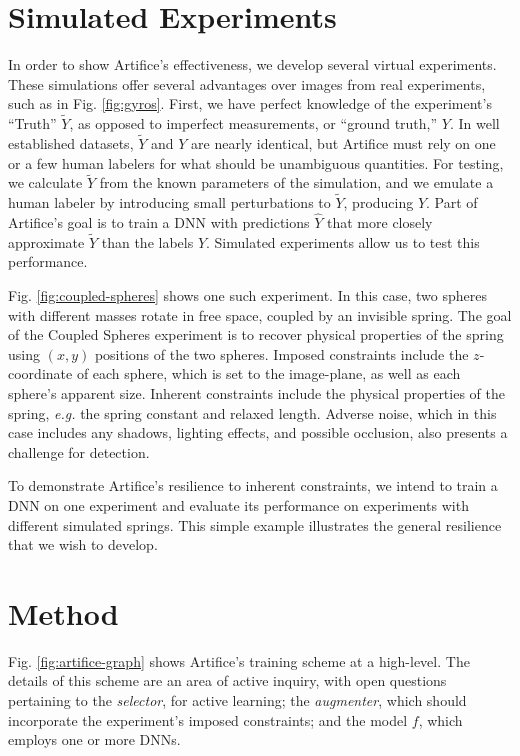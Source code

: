 \documentclass[10pt, journal]{IEEEtran}
\begin{document}
\section{Simulated Experiments}
\label{sec:simulated-experiments}

In order to show Artifice's effectiveness, we develop several virtual
experiments. These simulations offer several advantages over images from real
experiments, such as in Fig. \ref{fig:gyros}. First, we have perfect knowledge
of the experiment's ``Truth'' $\tilde{Y}$, as opposed to imperfect measurements,
or ``ground truth,'' $Y$. In well established datasets, $\tilde{Y}$ and $Y$ are
nearly identical, but Artifice must rely on one or a few human labelers for what
should be unambiguous quantities. For testing, we calculate $\tilde{Y}$ from the
known parameters of the simulation, and we emulate a human labeler by
introducing small perturbations to $\tilde{Y}$, producing $Y$. Part of
Artifice's goal is to train a DNN with predictions $\hat{Y}$ that more closely
approximate $\tilde{Y}$ than the labels $Y$. Simulated experiments allow us to
test this performance.

Fig. \ref{fig:coupled-spheres} shows one such experiment. In this case, two
spheres with different masses rotate in free space, coupled by an invisible
spring. The goal of the Coupled Spheres experiment is to recover physical
properties of the spring using $(x,y)$ positions of the two spheres. Imposed
constraints include the $z$-coordinate of each sphere, which is set to the
image-plane, as well as each sphere's apparent size. Inherent constraints
include the physical properties of the spring, \textit{e.g.} the spring constant
and relaxed length. Adverse noise, which in this case includes any shadows,
lighting effects, and possible occlusion, also presents a challenge for
detection.

To demonstrate Artifice's resilience to inherent constraints, we intend to train
a DNN on one experiment and evaluate its performance on experiments with
different simulated springs. This simple example illustrates the general
resilience that we wish to develop.

\section{Method}
\label{sec:method}

Fig. \ref{fig:artifice-graph} shows Artifice's training scheme at a
high-level. The details of this scheme are an area of active inquiry, with open
questions pertaining to the \emph{selector}, for active learning; the
\emph{augmenter}, which should incorporate the experiment's imposed constraints;
and the model $f$, which employs one or more DNNs.
\end{document}
